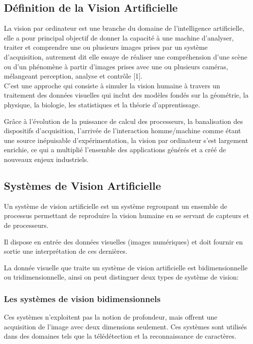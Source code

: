 \documentclass[12pt,a4paper,oneside]{book}
\begin{document}
	
	\subsection{Définition de la Vision Artificielle}
	
	La vision par ordinateur est une branche du domaine de l'intelligence artificielle, elle a pour principal objectif de donner la capacité à une machine d'analyser, traiter et comprendre une ou plusieurs images prises par un système d'acquisition, autrement dit elle essaye de réaliser une compréhension d’une scène ou d’un phénomène à partir d’images prises avec une ou plusieurs caméras, mélangeant perception, analyse et contrôle [1].\\
	
	C'est une approche qui consiste à simuler la vision humaine à travers un traitement des données visuelles qui inclut des modèles fondés sur la géométrie, la physique, la biologie, les statistiques et la théorie d’apprentissage.
	
	Grâce à l’évolution de la puissance de calcul des processeurs, la banalisation des dispositifs d’acquisition, l’arrivée de l’interaction homme/machine comme étant une source inépuisable d’expérimentation, la vision par ordinateur s'est largement enrichie, ce qui a multiplié l’ensemble des applications générés et a créé de nouveaux enjeux industriels.
	
	\subsection{Systèmes de Vision Artificielle}
	
	Un système de vision artificielle est un système regroupant un ensemble de processus permettant de reproduire la vision humaine en se servant de capteurs et de processeurs.
	
	Il dispose en entrée des données visuelles (images numériques) et doit fournir en sortie une interprétation de ces dernières.
	
	La donnée visuelle que traite un système de vision artificielle est bidimensionnelle ou tridimensionnelle, ainsi on peut distinguer deux types de système de vision:
	
	\subsubsection{Les systèmes de vision bidimensionnels}
	Ces systèmes n'exploitent pas la notion de profondeur, mais offrent une acquisition de l'image avec deux dimensions seulement. Ces systèmes sont utilisés dans des domaines tels que la télédétection et la reconnaissance de caractères.
	
\end{document}
